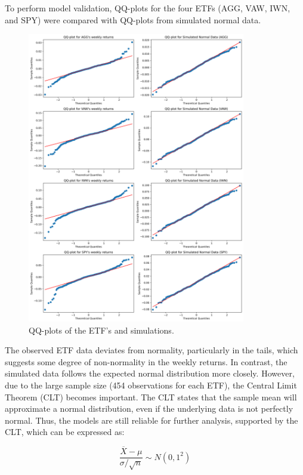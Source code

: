 \documentclass{rapport}
\begin{document}
\pagebreak
\noindent
To perform model validation, QQ-plots for the four ETFs (AGG, VAW, IWN, and SPY) were compared with QQ-plots from simulated normal data.
\begin{figure}[H]
    \centering
    \includegraphics[width=0.85\textwidth]{figure_7_QQ_plots.png}  %
    \caption{\small QQ-plots of the ETF's and simulations.}  %
    \label{fig:histogram_AGG}
\end{figure}
\noindent
 
The observed ETF data deviates from normality, particularly in the tails, which suggests some degree of non-normality in the weekly returns. 
In contrast, the simulated data follows the expected normal distribution more closely.
However, due to the large sample size (454 observations for each ETF), the Central Limit Theorem (CLT) becomes important. 
The CLT states that the sample mean will approximate a normal distribution, even if the underlying data is not perfectly normal. 
Thus, the models are still reliable for further analysis, supported by the CLT, which can be expressed as:

\begin{equation}
    \frac{\overline{X} - \mu}{\sigma / \sqrt{n}} \sim N(0, 1^2)
    \label{eq:CLT}
    \end{equation}
    
\end{document}
